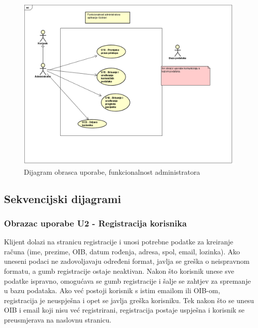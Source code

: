 				\begin{figure}[H]
					\includegraphics[scale=0.6]{dijagrami/UCAdministrator.PNG}
					\centering
					\caption{Dijagram obrasca uporabe, funkcionalnost administratora}
					\label{fig:myChart}
				\end{figure}
				
			\subsection{Sekvencijski dijagrami}
				
				\subsubsection{Obrazac uporabe U2 - Registracija korisnika}
				Klijent dolazi na stranicu registracije i unosi potrebne podatke za kreiranje računa (ime, prezime, OIB, datum rođenja, adresa, spol, email, lozinka). Ako uneseni podaci ne zadovoljavaju određeni format, javlja se greška o neispravnom formatu, a gumb registracije ostaje neaktivan. Nakon što korisnik unese sve podatke ispravno, omogućava se gumb registracije i šalje se zahtjev za spremanje u bazu podataka. Ako već postoji korisnik s istim emailom ili OIB-om, registracija je neuspješna i opet se javlja greška korisniku. Tek nakon što se unesu OIB i email koji nisu već registrirani, registracija postaje uspješna i korisnik se preusmjerava na naslovnu stranicu.
				
